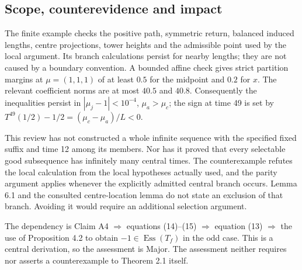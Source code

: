 \documentclass[10pt]{article}
\begin{document}
\subsection*{Scope, counterevidence and impact}
The finite example checks the positive path, symmetric return, balanced induced lengths, centre projections, tower heights and the admissible point used by the local argument. Its branch calculations persist for nearby lengths; they are not caused by a boundary convention. A bounded affine check gives strict partition margins at \(\mu=(1,1,1)\) of at least \(0.5\) for the midpoint and \(0.2\) for \(x\). The relevant coefficient norms are at most \(40.5\) and \(40.8\). Consequently the inequalities persist in \(|\mu_j-1|<10^{-4}\), \(\mu_a>\mu_c\); the sign at time 49 is set by \(T^{49}(1/2)-1/2=(\mu_c-\mu_a)/L<0\).\par
This review has not constructed a whole infinite sequence with the specified fixed suffix and time 12 among its members. Nor has it proved that every selectable good subsequence has infinitely many central times. The counterexample refutes the local calculation from the local hypotheses actually used, and the parity argument applies whenever the explicitly admitted central branch occurs. Lemma 6.1 and the consulted centre-location lemma do not state an exclusion of that branch. Avoiding it would require an additional selection argument.\par
The dependency is Claim A4 \(\Rightarrow\) equations (14)–(15) \(\Rightarrow\) equation (13) \(\Rightarrow\) the use of Proposition 4.2 to obtain \(-1\in\mathop{\mathrm{Ess}}(T_f)\) in the odd case. This is a central derivation, so the assessment is Major. The assessment neither requires nor asserts a counterexample to Theorem 2.1 itself.\par
\end{document}
